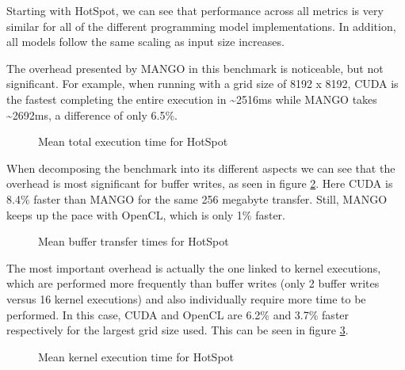 Starting with HotSpot, we can see that performance across all metrics is very similar for all of the different programming model implementations. In addition, all models follow the same scaling as input size increases. 

The overhead presented by MANGO in this benchmark is noticeable, but not significant. For example, when running with a grid size of 8192 x 8192, CUDA is the fastest completing the entire execution in \textasciitilde 2516ms while MANGO takes \textasciitilde 2692ms, a difference of only 6.5\%. 

\begin{figure}
    \centering
    \resizebox{!}{180pt}{
        
    }
    \captionsetup{justification=centering}
    \caption{Mean total execution time for HotSpot}
    \label{fig:hotspot_total_duration_mean}
\end{figure}

When decomposing the benchmark into its different aspects we can see that the overhead is most significant for buffer writes, as seen in figure \ref{fig:hotspot_buffer_transfers_mean}. Here CUDA is 8.4\% faster than MANGO for the same 256 megabyte transfer. Still, MANGO keeps up the pace with OpenCL, which is only 1\% faster.

\begin{figure}%
    \centering
    \qquad
    \captionsetup{justification=centering}
    \caption{Mean buffer transfer times for HotSpot}%
    \label{fig:hotspot_buffer_transfers_mean}%
\end{figure}

The most important overhead is actually the one linked to kernel executions, which are performed more frequently than buffer writes (only 2 buffer writes versus 16 kernel executions) and also individually require more time to be performed. In this case, CUDA and OpenCL are 6.2\% and 3.7\% faster respectively for the largest grid size used. This can be seen in figure \ref{fig:hotspot_kernel_executions_mean}.

\begin{figure}
    \centering
    \resizebox{!}{160pt}{
        
    }
    \captionsetup{justification=centering}
    \caption{Mean kernel execution time for HotSpot}
    \label{fig:hotspot_kernel_executions_mean}
\end{figure}

